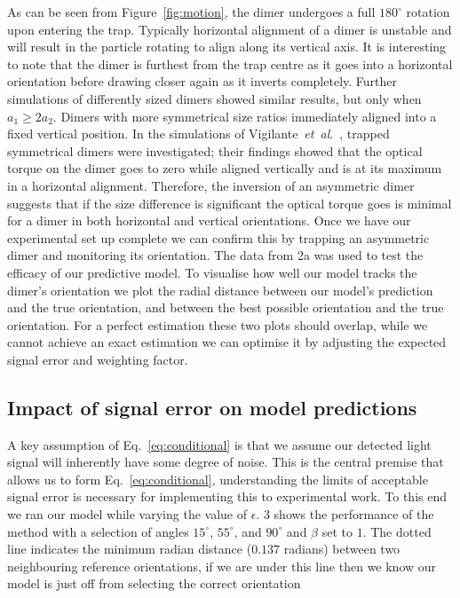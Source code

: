 \documentclass[final, 3p]{elsarticle}
\begin{document}
As can be seen from Figure~\ref{fig:motion}, the dimer undergoes a
full $180^{\circ}$ rotation upon entering the trap.  Typically
horizontal alignment of a dimer is unstable and will result in the
particle rotating to align along its vertical axis.  It is interesting
to note that the dimer is furthest from the trap centre as it goes
into a horizontal orientation before drawing closer again as it
inverts completely. Further simulations of differently sized dimers
showed similar results, but only when $a_1 \geq 2a_2$.  Dimers with
more symmetrical size ratios immediately aligned into a fixed vertical
position.
%
In the simulations of Vigilante~\emph{et~al}.\
\cite{Vigilante2020Brownian_OT}, trapped symmetrical dimers were
investigated; their findings showed that the optical torque on the
dimer goes to zero while aligned vertically and is at its maximum in a
horizontal alignment.  Therefore, the inversion of an asymmetric dimer
suggests that if the size difference is significant the optical torque
goes is minimal for a dimer in both horizontal and vertical
orientations. Once we have our experimental set up complete we can
confirm this by trapping an asymmetric dimer and monitoring its
orientation.  The data from \figurename{ 2a} was used to test the
efficacy of our predictive model.  To visualise how well our model
tracks the dimer's orientation we plot the radial distance between our
model's prediction and the true orientation, and between the best
possible orientation and the true orientation.  For a perfect
estimation these two plots should overlap, while we cannot achieve an
exact estimation we can optimise it by adjusting the expected signal
error and weighting factor.


\subsection{Impact of signal error on model predictions}
\label{sec:3.2}

A key assumption of Eq.~\eqref{eq:conditional} is that we assume our
detected light signal will inherently have some degree of noise. This
is the central premise that allows us to form
Eq.~\eqref{eq:conditional}, understanding the limits of acceptable
signal error is necessary for implementing this to experimental work.
To this end we ran our model while varying the value of $\epsilon$.
\figurename{ 3} shows the performance of the method with a selection
of angles $15^{\circ}$, $55^{\circ}$, and $90^{\circ}$ and $\beta$ set
to $1$.  The dotted line indicates the minimum radian distance
($0.137$ radians) between two neighbouring reference orientations, if
we are under this line then we know our model is just off from
selecting the correct orientation
\end{document}
